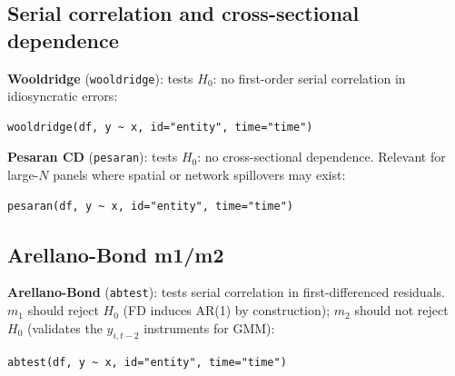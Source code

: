 \subsection{Serial correlation and cross-sectional dependence}

\textbf{Wooldridge} (\texttt{wooldridge}): tests $H_0$: no first-order
serial correlation in idiosyncratic errors:

\begin{lstlisting}
wooldridge(df, y ~ x, id="entity", time="time")
\end{lstlisting}

\textbf{Pesaran CD} (\texttt{pesaran}): tests $H_0$: no cross-sectional
dependence. Relevant for large-$N$ panels where spatial or network spillovers
may exist:

\begin{lstlisting}
pesaran(df, y ~ x, id="entity", time="time")
\end{lstlisting}

\subsection{Arellano-Bond m1/m2}

\textbf{Arellano-Bond} (\texttt{abtest}): tests serial correlation in
first-differenced residuals. $m_1$ should reject $H_0$ (FD induces AR(1) by
construction); $m_2$ should not reject $H_0$ (validates the $y_{i,t-2}$
instruments for GMM):

\begin{lstlisting}
abtest(df, y ~ x, id="entity", time="time")
\end{lstlisting}

